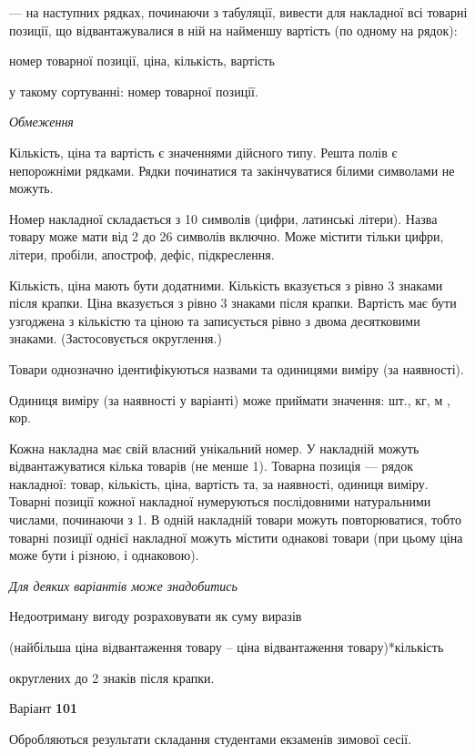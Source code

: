 \documentclass[11pt, ukrainian]{article}
\begin{document}
{\noindent}--- на наступних рядках, починаючи з табуляції, вивести для накладної всі товарні позиції, що відвантажувалися в ній на найменшу вартість (по одному на рядок):\par
номер товарної позиції, ціна, кількість, вартість

{\noindent}у такому сортуванні: номер товарної позиції.


\bigskip\textit{Обмеження}

Кількість, ціна та вартість є значеннями дійсного типу.
Решта полів є непорожніми рядками.
Рядки починатися та закінчуватися білими символами не можуть.

Номер накладної складається з 10 символів (цифри, латинські літери).
Назва товару може мати від 2 до 26 символів включно.
Може містити тільки цифри, літери, пробіли, апостроф, дефіс, підкреслення.

Кількість, ціна мають бути додатними.
Кількість вказується з рівно 3 знаками після крапки.
Ціна вказується з рівно 3 знаками після крапки.
Вартість має бути узгоджена з кількістю та ціною та записується рівно з двома десятковими знаками.
(Застосовується округлення.)

Товари однозначно ідентифікуються назвами та одиницями виміру (за наявності).

Одиниця виміру (за наявності у варіанті) може приймати значення: шт., кг, м , кор.

Кожна накладна має свій власний унікальний номер.
У накладній можуть відвантажуватися кілька товарів (не менше 1).
Товарна позиція --- рядок накладної: товар, кількість, ціна, вартість та, за наявності, одиниця виміру.
Товарні позиції кожної накладної нумеруються послідовними натуральними числами, починаючи з 1.
В одній накладній товари можуть повторюватися, 
тобто товарні позиції однієї накладної можуть містити однакові товари 
(при цьому ціна може бути і різною, і однаковою).

\bigskip\textit{Для деяких варіантів може знадобитись}

Недоотриману вигоду розраховувати як суму виразів
{\center (найбільша ціна відвантаження товару – ціна відвантаження товару)*кількість\par}

\bigskip
{\noindent} округлених до 2 знаків після крапки.




\par
\newpage
{\center Варіант  \No \textbf { 101 }\par}
\bigskip
Обробляються результати складання студентами екзаменів зимової сесії.
\end{document}
